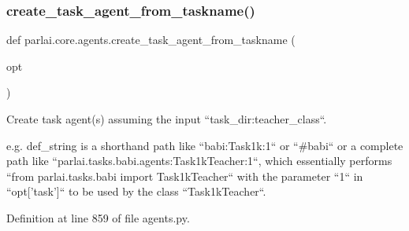\subsubsection{\texorpdfstring{create\+\_\+task\+\_\+agent\+\_\+from\+\_\+taskname()}{create\_task\_agent\_from\_taskname()}}
{\footnotesize\ttfamily def parlai.\+core.\+agents.\+create\+\_\+task\+\_\+agent\+\_\+from\+\_\+taskname (\begin{DoxyParamCaption}\item[{}]{opt }\end{DoxyParamCaption})}

\begin{DoxyVerb}Create task agent(s) assuming the input ``task_dir:teacher_class``.

e.g. def_string is a shorthand path like ``babi:Task1k:1`` or ``#babi`` or a
complete path like ``parlai.tasks.babi.agents:Task1kTeacher:1``, which essentially
performs ``from parlai.tasks.babi import Task1kTeacher`` with the parameter ``1`` in
``opt['task']`` to be used by the class ``Task1kTeacher``.
\end{DoxyVerb}
 

Definition at line 859 of file agents.\+py.


